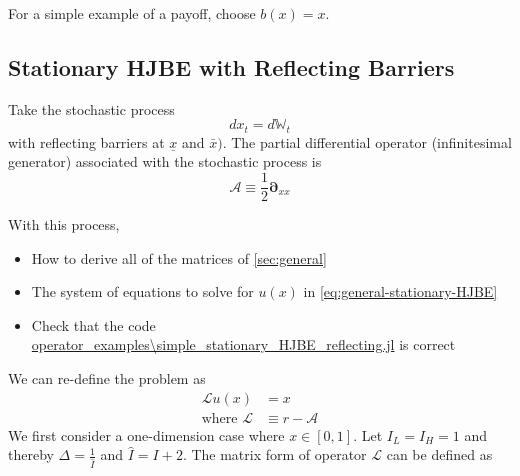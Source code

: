 \documentclass[11pt]{article}
\newcommand{\D}[1][]{\ensuremath{\boldsymbol{\partial}_{#1}}}
\newcommand{\W}{\ensuremath{\mathbb{W}}}
\newcommand{\A}{\ensuremath{\mathcal{A}}}
\begin{document}
For a simple example of a payoff, choose $b(x) = x$.

\subsection{Stationary HJBE with Reflecting Barriers}
Take the stochastic process
$$
d x_t = d \W_t
$$
with reflecting barriers at $\underline{x}$ and $\bar{x})$.  The partial differential operator (infinitesimal generator) associated with the stochastic process is
$$
	\A \equiv \frac{1}{2}\D[xx]
$$

With this process,
\begin{itemize}
	\item How to derive all of the matrices of \cref{sec:general}
	\item The system of equations to solve for $u(x)$ in \cref{eq:general-stationary-HJBE}
	\item Check that the code \url{operator_examples\simple_stationary_HJBE_reflecting.jl} is correct
\end{itemize}
We can re-define the problem as 
\begin{align}
\mathcal{L} u(x) &= x\label{HJBE_reflecting_barriers_PDE}\\
\text{where }\mathcal{L}&\equiv r - \A
\end{align}
We first consider a one-dimension case where $x\in [0, 1]$. Let $I_L = I_H = 1$ and thereby $\Delta  = \frac{1}{\hat{I}}$ and $\hat{I} = I+2$. The matrix form of operator $\mathcal{L}$ can be defined as
\end{document}
